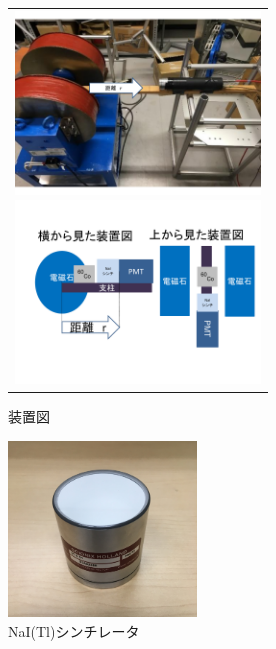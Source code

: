 \begin{figure}[tbp]
  \begin{center}
    \begin{tabular}{c}
      \begin{minipage}[t]{0.5\hsize}    
        \begin{center}
          \includegraphics[width=6.5cm]{fig/iguchi/2inchsokutei.pdf}
	\caption{2インチPMTの測定装置}
	\label{2inchsokutei}
     \end{center}
    \end{minipage}
      \begin{minipage}[t]{0.5\hsize}    
        \begin{center}
          \includegraphics[width=6.5cm]{fig/iguchi/soutizu1.pdf}
         \caption{装置図}
	\label{soutizu1}
         \end{center}
        \end{minipage}
     
     \end{tabular}
    \end{center}
 \end{figure}

\begin{figure}[tbp]
	\centering
	\includegraphics[width=5cm]{fig/iguchi/NaIscinti.jpg}
	\caption{NaI(Tl)シンチレータ}
	\label{NaIscinti}
\end{figure}

